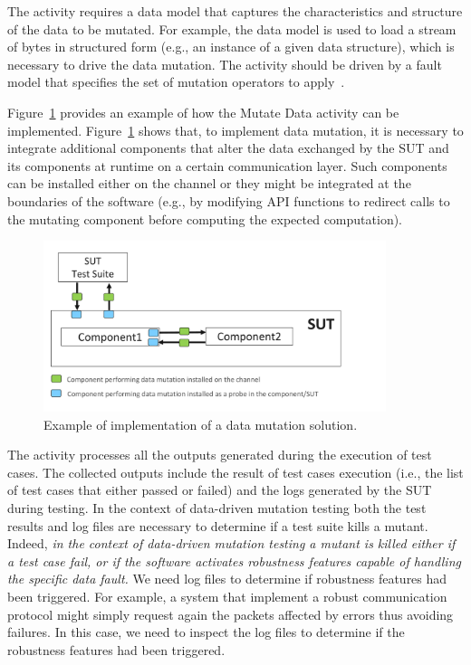 The activity  requires a data model that captures the characteristics and structure of the data to be mutated. 
For example, the data model is used to load a stream of bytes in structured form (e.g., an instance of a given data structure), which is necessary to drive the data mutation. 
The activity  should be driven by a fault model that specifies the set of mutation operators to apply~\cite{di2015generating}. 

Figure~\ref{fig:data:mutateData} provides an example of how the Mutate Data activity can be implemented. Figure~\ref{fig:data:mutateData} shows that, to implement data mutation, it is necessary to integrate additional components that alter the data exchanged by the SUT and its components at runtime on a certain communication layer. Such components can be installed either on the channel or they might be integrated at the boundaries of the software (e.g., by modifying API functions to redirect calls to the mutating component before computing the expected computation).

	\begin{figure}
	\centering
		\includegraphics[width=10cm]{images/dataMutationExample}
		\caption{Example of implementation of a data mutation solution.}
		\label{fig:data:mutateData}
	\end{figure}


The activity  processes all the outputs generated during the execution of test cases.
The collected outputs include the result of test cases execution (i.e., the list of test cases that either passed or failed) and the logs generated by the SUT during testing.
In the context of data-driven mutation testing both the test results and log files are necessary to determine if a test suite kills a mutant.
Indeed, \emph{in the context of data-driven mutation testing a mutant is killed either if a test case fail, or if the software activates robustness features capable of handling the specific data fault.}
We need log files to determine if robustness features had been triggered.
For example, a system that implement a robust communication protocol might simply request again the packets affected by errors thus avoiding failures. In this case, we need to inspect the log files to determine if the robustness features had been triggered.

